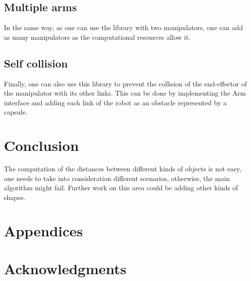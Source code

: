 \documentclass[a4paper, 10pt, conference]{ieeeconf}      %
\begin{document}
\subsection{Multiple arms}
In the same way, as one can use the library with two manipulators, one can add as many manipulators as the computational resources allow it.
\subsection{Self collision} %
Finally, one can also use this library to prevent the collision of the end-effector of the manipulator with its other links.
This can be done by implementing the Arm interface and adding each link of the robot as an obstacle represented by a capsule.

\section{Conclusion} %
The computation of the distances between different kinds of objects is not easy, one needs to take into consideration different scenarios, 
otherwise, the main algorithm might fail. Further work on this area could be adding other kinds of shapes.


\addtolength{\textheight}{-12cm}   %







\section*{Appendices}

\section*{Acknowledgments}
\end{document}

